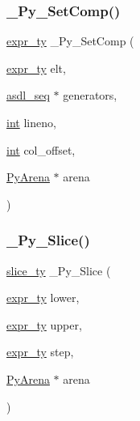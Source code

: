 \mbox{\label{_python-ast_8h_ac4460b8e0df62ceb60802eea5f299c19}} 
\subsubsection{\texorpdfstring{\_Py\_SetComp()}{\_Py\_SetComp()}}
{\footnotesize\ttfamily \mbox{\hyperlink{_python-ast_8h_a56d3705e020a071405094a220c4592bd}{expr\+\_\+ty}} \+\_\+\+Py\+\_\+\+Set\+Comp (\begin{DoxyParamCaption}\item[{\mbox{\hyperlink{_python-ast_8h_a56d3705e020a071405094a220c4592bd}{expr\+\_\+ty}}}]{elt,  }\item[{\mbox{\hyperlink{structasdl__seq}{asdl\+\_\+seq}} $\ast$}]{generators,  }\item[{\mbox{\hyperlink{warnings_8h_a74f207b5aa4ba51c3a2ad59b219a423b}{int}}}]{lineno,  }\item[{\mbox{\hyperlink{warnings_8h_a74f207b5aa4ba51c3a2ad59b219a423b}{int}}}]{col\+\_\+offset,  }\item[{\mbox{\hyperlink{pyarena_8h_a9edeb357fbb27333471022a0975adb7a}{Py\+Arena}} $\ast$}]{arena }\end{DoxyParamCaption})}

\mbox{\label{_python-ast_8h_a2319130e186f0697f6d7cc6d6c33b34c}} 
\subsubsection{\texorpdfstring{\_Py\_Slice()}{\_Py\_Slice()}}
{\footnotesize\ttfamily \mbox{\hyperlink{_python-ast_8h_a1aba5288236679e8faff34c189476bf0}{slice\+\_\+ty}} \+\_\+\+Py\+\_\+\+Slice (\begin{DoxyParamCaption}\item[{\mbox{\hyperlink{_python-ast_8h_a56d3705e020a071405094a220c4592bd}{expr\+\_\+ty}}}]{lower,  }\item[{\mbox{\hyperlink{_python-ast_8h_a56d3705e020a071405094a220c4592bd}{expr\+\_\+ty}}}]{upper,  }\item[{\mbox{\hyperlink{_python-ast_8h_a56d3705e020a071405094a220c4592bd}{expr\+\_\+ty}}}]{step,  }\item[{\mbox{\hyperlink{pyarena_8h_a9edeb357fbb27333471022a0975adb7a}{Py\+Arena}} $\ast$}]{arena }\end{DoxyParamCaption})}

